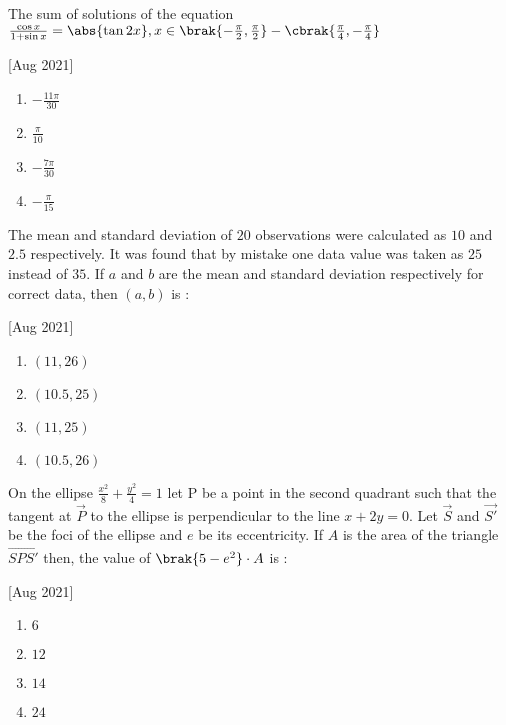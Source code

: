 \iffalse
\title{2021}
\author{EE24BTECH11019}
\section{mcq-single}
\fi

    \item The sum of solutions of the equation $\frac{\cos{x}}{1+\sin{x}}=\abs{\tan{2x}}, x \in \brak{-\frac{\pi}{2},\frac{\pi}{2}}-\cbrak{\frac{\pi}{4},-\frac{\pi}{4}}$
    
    \hfill[Aug 2021]
        \begin{enumerate}
            \item $-\frac{11\pi}{30}$
            \item $\frac{\pi}{10}$
            \item $-\frac{7\pi}{30}$
            \item $-\frac{\pi}{15}$
        \end{enumerate}
    
    \item The mean and standard deviation of $20$ observations were calculated as $10$ and $2.5$ respectively. It was found that by mistake one data value was taken as $25$ instead of $35$. If $a$ and $b$ are the mean and standard deviation respectively for correct data, then $(a,b)$ is :
    
    \hfill[Aug 2021]
        \begin{enumerate}
            \item $(11,26)$
            \item $(10.5,25)$
            \item $(11,25)$
            \item $(10.5,26)$
        \end{enumerate}
    
    \item On the ellipse $\frac{x^2}{8}+\frac{y^2}{4}=1$ let P be a point in the second quadrant such that the tangent at $\vec{P}$ to the ellipse is perpendicular to the line $x+2y=0$. Let $\vec{S}$ and $\vec{S'}$ be the foci of the ellipse and $e$ be its eccentricity. If $A$ is the area of the triangle $\vec{SPS'}$ then, the value of $\brak{5-e^2}\cdot A$ is :
    
    \hfill[Aug 2021]
        \begin{enumerate}
            \item $6$
            \item $12$
            \item $14$
            \item $24$
        \end{enumerate}

